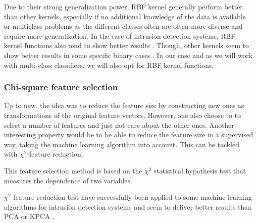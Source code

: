 Due to their strong generalization power, RBF kernel generally perform better than other kernels, especially if no additional knowledge of the data is available or multiclass problems as the different classes often are often more diverse and require more generalization. In the case of intrusion detection systems, RBF kernel functions also tend to show better results \cite{Kuang2014ADetection}. Though, other kernels seem to show better results in some specific binary cases \cite{Elkhadir2016IntrusionMethods}. In our case and as we will work with multi-class classifiers, we will also opt for RBF kernel functions.

\subsubsection{Chi-square feature selection}
Up to new, the idea was to reduce the feature size by constructing new ones as transformations of the original feature vectors. However, one also choose to to select a number of features and just not care about the other ones. Another interesting property would be to be able to reduce the feature size in a supervised way, taking the machine learning algorithm into account. This can be tackled with $\chi^2$-feature reduction.

This feature selection method is based on the $\chi^2$ statistical hypothesis test that measures the dependence of two variables.





$\chi^2$-feature reduction test have successfully been applied to some machine learning algorithms for intrusion detection systems and seem to deliver better results than PCA or KPCA \cite{SumaiyaThaseen2017IntrusionSVM}.